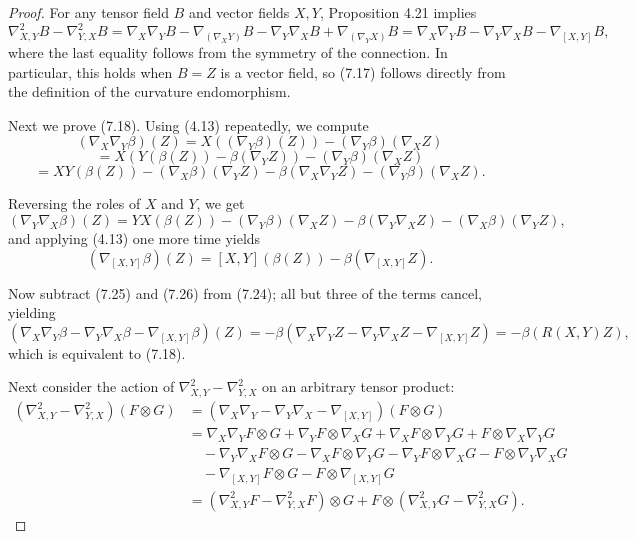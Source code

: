 \begin{proof}
For any tensor field $B$ and vector fields $X, Y$, Proposition 4.21 implies
\begin{equation}
\nabla^2_{X,Y} B - \nabla^2_{Y,X} B = \nabla_X \nabla_Y B - \nabla_{(\nabla_X Y)} B - \nabla_Y \nabla_X B + \nabla_{(\nabla_Y X)} B
= \nabla_X \nabla_Y B - \nabla_Y \nabla_X B - \nabla_{[X,Y]} B, \tag{7.23}
\end{equation}
where the last equality follows from the symmetry of the connection. In particular, this holds when $B = Z$ is a vector field, so (7.17) follows directly from the definition of the curvature endomorphism.

Next we prove (7.18). Using (4.13) repeatedly, we compute
\[
(\nabla_X \nabla_Y \beta)(Z) = X((\nabla_Y \beta)(Z)) - (\nabla_Y \beta)(\nabla_X Z)
\]
\[
= X(Y(\beta(Z)) - \beta(\nabla_Y Z)) - (\nabla_Y \beta)(\nabla_X Z)
\]
\begin{equation}
= XY(\beta(Z)) - (\nabla_X \beta)(\nabla_Y Z) - \beta(\nabla_X \nabla_Y Z) - (\nabla_Y \beta)(\nabla_X Z). \tag{7.24}
\end{equation}

Reversing the roles of $X$ and $Y$, we get
\begin{equation}
(\nabla_Y \nabla_X \beta)(Z) = YX(\beta(Z)) - (\nabla_Y \beta)(\nabla_X Z) - \beta(\nabla_Y \nabla_X Z) - (\nabla_X \beta)(\nabla_Y Z), \tag{7.25}
\end{equation}
and applying (4.13) one more time yields
\begin{equation}
(\nabla_{[X,Y]} \beta)(Z) = [X,Y](\beta(Z)) - \beta(\nabla_{[X,Y]} Z). \tag{7.26}
\end{equation}

Now subtract (7.25) and (7.26) from (7.24); all but three of the terms cancel, yielding
\[
(\nabla_X \nabla_Y \beta - \nabla_Y \nabla_X \beta - \nabla_{[X,Y]} \beta)(Z) = -\beta(\nabla_X \nabla_Y Z - \nabla_Y \nabla_X Z - \nabla_{[X,Y]} Z)
= -\beta(R(X,Y)Z),
\]
which is equivalent to (7.18).

Next consider the action of $\nabla^2_{X,Y} - \nabla^2_{Y,X}$ on an arbitrary tensor product:
\begin{align*}
(\nabla^2_{X,Y} - \nabla^2_{Y,X})(F \otimes G)
&= (\nabla_X \nabla_Y - \nabla_Y \nabla_X - \nabla_{[X,Y]})(F \otimes G)\\
&= \nabla_X \nabla_Y F \otimes G + \nabla_Y F \otimes \nabla_X G + \nabla_X F \otimes \nabla_Y G + F \otimes \nabla_X \nabla_Y G\\
&\quad - \nabla_Y \nabla_X F \otimes G - \nabla_X F \otimes \nabla_Y G - \nabla_Y F \otimes \nabla_X G - F \otimes \nabla_Y \nabla_X G\\
&\quad - \nabla_{[X,Y]} F \otimes G - F \otimes \nabla_{[X,Y]} G\\
&= (\nabla^2_{X,Y} F - \nabla^2_{Y,X} F) \otimes G + F \otimes (\nabla^2_{X,Y} G - \nabla^2_{Y,X} G).
\end{align*}


\end{proof}

